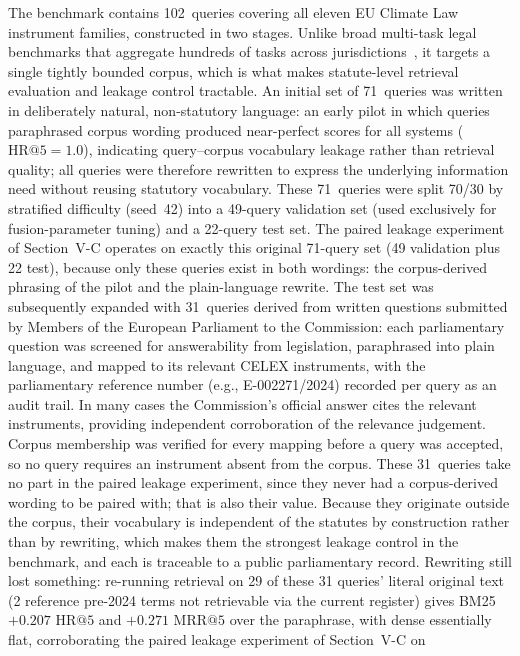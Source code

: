 \documentclass[conference,a4paper]{IEEEtran}
\makeatletter
\newcommand{\HR}[1]{\mathrm{HR}@{#1}}
\newcommand{\MRR}[1]{\mathrm{MRR}@{#1}}
\makeatother
\begin{document}
The benchmark contains 102~queries covering all eleven EU Climate Law
instrument families, constructed in two stages.
Unlike broad multi-task legal benchmarks that aggregate hundreds of
tasks across jurisdictions~\cite{22}, it targets a single tightly
bounded corpus, which is what makes statute-level retrieval evaluation
and leakage control tractable.
An initial set of 71~queries was written in deliberately natural,
non-statutory language: an early pilot in which queries paraphrased
corpus wording produced near-perfect scores for all systems
($\HR{5}{=}1.0$), indicating query--corpus vocabulary leakage rather
than retrieval quality; all queries were therefore rewritten to
express the underlying information need without reusing statutory
vocabulary.
These 71~queries were split 70/30 by stratified difficulty (seed~42)
into a 49-query validation set (used exclusively for fusion-parameter
tuning) and a 22-query test set.
The paired leakage experiment of Section~V-C operates on exactly this
original 71-query set (49 validation plus 22 test), because only
these queries exist in both wordings: the corpus-derived phrasing of
the pilot and the plain-language rewrite.
The test set was subsequently expanded with 31~queries derived from
written questions submitted by Members of the European Parliament to
the Commission: each parliamentary question was screened for
answerability from legislation, paraphrased into plain language, and
mapped to its relevant CELEX instruments, with the parliamentary
reference number (e.g., E-002271/2024) recorded per query as an audit
trail.
In many cases the Commission's official answer cites the relevant
instruments, providing independent corroboration of the relevance
judgement.
Corpus membership was verified for every mapping before a query was
accepted, so no query requires an instrument absent from the corpus.
These 31~queries take no part in the paired leakage experiment, since
they never had a corpus-derived wording to be paired with; that is
also their value.
Because they originate outside the corpus, their vocabulary is
independent of the statutes by construction rather than by rewriting,
which makes them the strongest leakage control in the benchmark, and
each is traceable to a public parliamentary record.
Rewriting still lost something: re-running retrieval on 29 of these
31 queries' literal original text (2 reference pre-2024 terms not
retrievable via the current register) gives BM25 $+0.207$ $\HR{5}$
and $+0.271$ $\MRR{5}$ over the paraphrase, with dense essentially
flat, corroborating the paired leakage experiment of Section~V-C on
\end{document}
